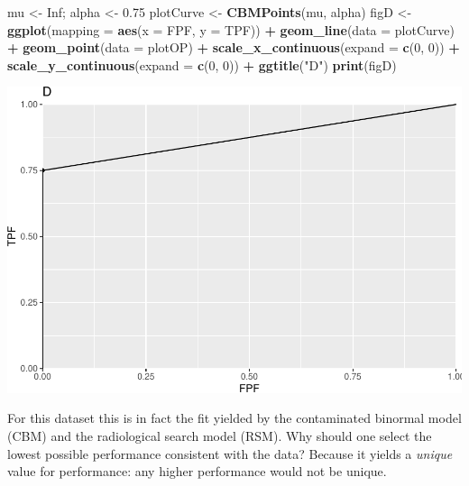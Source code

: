 \documentclass[]{book}
\newenvironment{Shaded}{\begin{snugshade}}{\end{snugshade}}
\newcommand{\DataTypeTok}[1]{\textcolor[rgb]{0.13,0.29,0.53}{#1}}
\newcommand{\DecValTok}[1]{\textcolor[rgb]{0.00,0.00,0.81}{#1}}
\newcommand{\FloatTok}[1]{\textcolor[rgb]{0.00,0.00,0.81}{#1}}
\newcommand{\KeywordTok}[1]{\textcolor[rgb]{0.13,0.29,0.53}{\textbf{#1}}}
\newcommand{\NormalTok}[1]{#1}
\newcommand{\OperatorTok}[1]{\textcolor[rgb]{0.81,0.36,0.00}{\textbf{#1}}}
\newcommand{\OtherTok}[1]{\textcolor[rgb]{0.56,0.35,0.01}{#1}}
\newcommand{\StringTok}[1]{\textcolor[rgb]{0.31,0.60,0.02}{#1}}
\begin{document}
\begin{Shaded}
\begin{Highlighting}[]
\NormalTok{mu <-}\StringTok{ }\OtherTok{Inf}\NormalTok{; alpha <-}\StringTok{ }\FloatTok{0.75}
\NormalTok{plotCurve <-}\StringTok{ }\KeywordTok{CBMPoints}\NormalTok{(mu, alpha)}
\NormalTok{figD <-}\StringTok{ }\KeywordTok{ggplot}\NormalTok{(}\DataTypeTok{mapping =} \KeywordTok{aes}\NormalTok{(}\DataTypeTok{x =}\NormalTok{ FPF, }\DataTypeTok{y =}\NormalTok{ TPF)) }\OperatorTok{+}\StringTok{ }
\StringTok{  }\KeywordTok{geom_line}\NormalTok{(}\DataTypeTok{data =}\NormalTok{ plotCurve) }\OperatorTok{+}\StringTok{ }
\StringTok{  }\KeywordTok{geom_point}\NormalTok{(}\DataTypeTok{data =}\NormalTok{ plotOP)  }\OperatorTok{+}\StringTok{ }
\StringTok{  }\KeywordTok{scale_x_continuous}\NormalTok{(}\DataTypeTok{expand =} \KeywordTok{c}\NormalTok{(}\DecValTok{0}\NormalTok{, }\DecValTok{0}\NormalTok{)) }\OperatorTok{+}\StringTok{ }
\StringTok{  }\KeywordTok{scale_y_continuous}\NormalTok{(}\DataTypeTok{expand =} \KeywordTok{c}\NormalTok{(}\DecValTok{0}\NormalTok{, }\DecValTok{0}\NormalTok{)) }\OperatorTok{+}
\StringTok{  }\KeywordTok{ggtitle}\NormalTok{(}\StringTok{"D"}\NormalTok{)}
\KeywordTok{print}\NormalTok{(figD)}
\end{Highlighting}
\end{Shaded}

\begin{center}\includegraphics{22-DegenerateROCs_files/figure-latex/unnamed-chunk-4-1} \end{center}

For this dataset this is in fact the fit yielded by the contaminated binormal model (CBM) and the radiological search model (RSM). Why should one select the lowest possible performance consistent with the data? Because it yields a \emph{unique} value for performance: any higher performance would not be unique.
\end{document}
